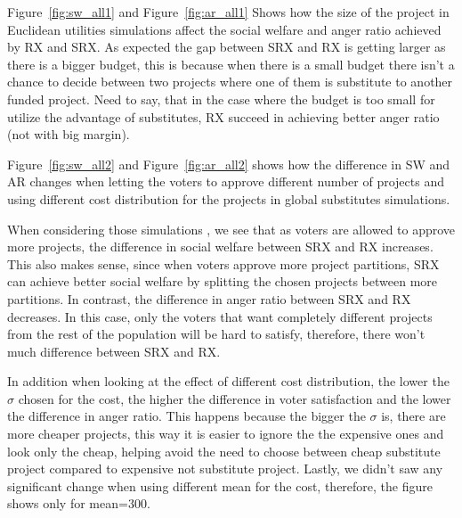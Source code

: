 \documentclass[runningheads]{llncs}
\begin{document}
\begin{subappendices}
Figure~\ref{fig:sw_all1} and Figure~\ref{fig:ar_all1} Shows how the size of the project in Euclidean utilities simulations affect the social welfare and anger ratio achieved by RX and SRX. As expected the gap between SRX and RX is getting larger as there is a bigger budget, this is because when there is a small budget there isn't a chance to decide between two projects where one of them is substitute to another funded project. Need to say, that in the case where the budget is too small for utilize the advantage of substitutes, RX succeed in achieving better anger ratio (not with big margin).

Figure~\ref{fig:sw_all2} and Figure~\ref{fig:ar_all2} shows how the difference in SW and AR changes when letting the voters to approve different number of projects and using different cost distribution for the projects in global substitutes simulations.

When considering those   simulations , we   see that as  voters are allowed to approve more projects, the difference in social welfare between SRX and RX increases. This also makes sense, since when voters approve more project partitions, SRX can achieve better social welfare by splitting the chosen projects between more partitions. In contrast, the difference in anger ratio between SRX and RX decreases. In this case, only the voters that want completely different projects from the rest of the population will be hard to satisfy, therefore, there won't much difference between SRX and RX.


In addition when looking at the effect of different cost distribution, the lower the $\sigma$ chosen for the cost, the higher the difference in voter satisfaction and the lower the difference in anger ratio. This happens because the bigger the $\sigma$ is, there are more cheaper projects, this way it is easier to ignore the the expensive ones and look only the cheap, helping avoid the need to choose between cheap substitute project compared to expensive not substitute project. Lastly, we didn't saw any significant change when using different mean for the cost, therefore, the figure shows only for mean=300.


\end{subappendices}
\end{document}
